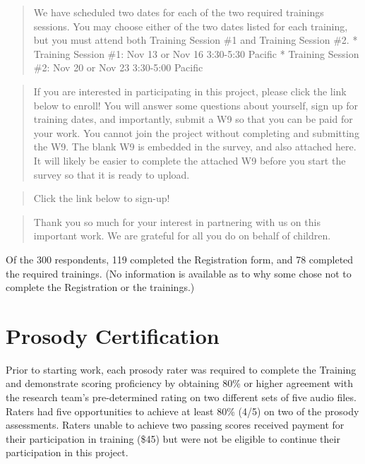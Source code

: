 \documentclass[
]{article}
\begin{document}
\begin{quote}
We have scheduled two dates for each of the two required trainings
sessions. You may choose either of the two dates listed for each
training, but you must attend both Training Session \#1 and Training
Session \#2. * Training Session \#1: Nov 13 or Nov 16 3:30-5:30 Pacific
* Training Session \#2: Nov 20 or Nov 23 3:30-5:00 Pacific
\end{quote}

\begin{quote}
If you are interested in participating in this project, please click the
link below to enroll! You will answer some questions about yourself,
sign up for training dates, and importantly, submit a W9 so that you can
be paid for your work. You cannot join the project without completing
and submitting the W9. The blank W9 is embedded in the survey, and also
attached here. It will likely be easier to complete the attached W9
before you start the survey so that it is ready to upload.
\end{quote}

\begin{quote}
Click the link below to sign-up!
\end{quote}

\begin{quote}
Thank you so much for your interest in partnering with us on this
important work. We are grateful for all you do on behalf of children.
\end{quote}

Of the 300 respondents, 119 completed the Registration form, and 78
completed the required trainings. (No information is available as to why
some chose not to complete the Registration or the trainings.)

\hypertarget{prosody-certification}{%
\section{Prosody Certification}\label{prosody-certification}}

Prior to starting work, each prosody rater was required to complete the
Training and demonstrate scoring proficiency by obtaining 80\% or higher
agreement with the research team's pre-determined rating on two
different sets of five audio files. Raters had five opportunities to
achieve at least 80\% (4/5) on two of the prosody assessments. Raters
unable to achieve two passing scores received payment for their
participation in training (\$45) but were not be eligible to continue
their participation in this project.
\end{document}
